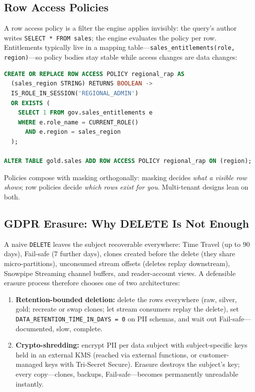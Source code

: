\subsection{Row Access Policies}
A row access policy is a filter the engine applies invisibly: the query's author writes \texttt{SELECT * FROM sales}; the engine evaluates the policy per row. Entitlements typically live in a mapping table---\texttt{sales\_entitlements(role, region)}---so policy bodies stay stable while access changes are data changes:

\begin{lstlisting}[language=SQL, caption={Row access policy driven by an entitlements table}]
CREATE OR REPLACE ROW ACCESS POLICY regional_rap AS
  (sales_region STRING) RETURNS BOOLEAN ->
  IS_ROLE_IN_SESSION('REGIONAL_ADMIN')
  OR EXISTS (
    SELECT 1 FROM gov.sales_entitlements e
    WHERE e.role_name = CURRENT_ROLE()
      AND e.region = sales_region
  );

ALTER TABLE gold.sales ADD ROW ACCESS POLICY regional_rap ON (region);
\end{lstlisting}

Policies compose with masking orthogonally: masking decides \emph{what a visible row shows}; row policies decide \emph{which rows exist for you}. Multi-tenant designs lean on both.

\subsection{GDPR Erasure: Why DELETE Is Not Enough}
A naive \texttt{DELETE} leaves the subject recoverable everywhere: Time Travel (up to 90 days), Fail-safe (7 further days), clones created before the delete (they share micro-partitions), unconsumed stream offsets (deletes replay downstream), Snowpipe Streaming channel buffers, and reader-account views. A defensible erasure process therefore chooses one of two architectures:

\begin{enumerate}
    \item \textbf{Retention-bounded deletion:} delete the rows everywhere (raw, silver, gold; recreate or swap clones; let stream consumers replay the delete), set \texttt{DATA\_RETENTION\_TIME\_IN\_DAYS = 0} on PII schemas, and wait out Fail-safe---documented, slow, complete.
    \item \textbf{Crypto-shredding:} encrypt PII per data subject with subject-specific keys held in an external KMS (reached via external functions, or customer-managed keys with Tri-Secret Secure). Erasure destroys the subject's key; every copy---clones, backups, Fail-safe---becomes permanently unreadable instantly.
\end{enumerate}

